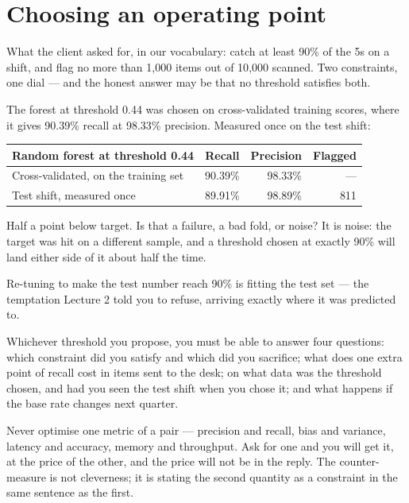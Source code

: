 \documentclass[11pt,a4paper]{article}
\begin{document}
\section{Choosing an operating point}

What the client asked for, in our vocabulary: catch at least 90\% of the 5s on
a shift, and flag no more than 1{,}000 items out of 10{,}000 scanned. Two
constraints, one dial --- and the honest answer may be that no threshold
satisfies both.

The forest at threshold 0.44 was chosen on cross-validated training scores,
where it gives 90.39\% recall at 98.33\% precision. Measured once on the test
shift:

\begin{center}
\small
\begin{tabular}{lrrr}
\toprule
\textbf{Random forest at threshold 0.44} & \textbf{Recall} &
\textbf{Precision} & \textbf{Flagged} \\
\midrule
Cross-validated, on the training set & 90.39\% & 98.33\% & --- \\
Test shift, measured once            & 89.91\% & 98.89\% & 811 \\
\bottomrule
\end{tabular}
\end{center}

Half a point below target. Is that a failure, a bad fold, or noise? It is
noise: the target was hit on a different sample, and a threshold chosen at
exactly 90\% will land either side of it about half the time.

\begin{failbox}[title={Failure condition --- tuning until the test number looks right}]
Re-tuning to make the test number reach 90\% is fitting the test set --- the
temptation Lecture 2 told you to refuse, arriving exactly where it was
predicted to.
\end{failbox}

Whichever threshold you propose, you must be able to answer four questions:
which constraint did you satisfy and which did you sacrifice; what does one
extra point of recall cost in items sent to the desk; on what data was the
threshold chosen, and had you seen the test shift when you chose it; and what
happens if the base rate changes next quarter.

\begin{keybox}[title={The general rule}]
Never optimise one metric of a pair --- precision and recall, bias and
variance, latency and accuracy, memory and throughput. Ask for one and you will
get it, at the price of the other, and the price will not be in the reply. The
counter-measure is not cleverness; it is stating the second quantity as a
constraint in the same sentence as the first.
\end{keybox}
\end{document}
